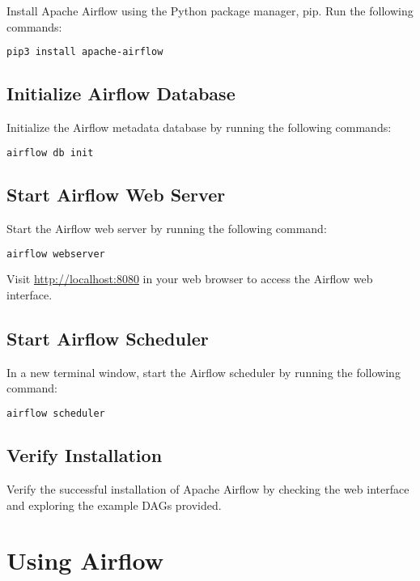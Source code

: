 Install Apache Airflow using the Python package manager, pip. Run the following commands:

\begin{lstlisting}[language=bash]
pip3 install apache-airflow
\end{lstlisting}

\subsection{Initialize Airflow Database}

Initialize the Airflow metadata database by running the following commands:

\begin{lstlisting}[language=bash]
airflow db init
\end{lstlisting}

\subsection{Start Airflow Web Server}

Start the Airflow web server by running the following command:

\begin{lstlisting}[language=bash]
airflow webserver
\end{lstlisting}

Visit \url{http://localhost:8080} in your web browser to access the Airflow web interface.

\subsection{Start Airflow Scheduler}

In a new terminal window, start the Airflow scheduler by running the following command:

\begin{lstlisting}[language=bash]
airflow scheduler
\end{lstlisting}

\subsection{Verify Installation}

Verify the successful installation of Apache Airflow by checking the web interface and exploring the example DAGs provided.

\section{Using Airflow}

